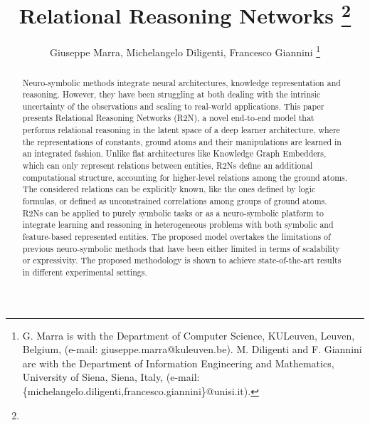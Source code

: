 \documentclass[journal]{IEEEtran}
\begin{document}
    \title{
    Relational Reasoning Networks
    \thanks{}}
  \author{Giuseppe Marra, Michelangelo Diligenti, Francesco Giannini \textbf{}
\thanks{G. Marra is with the Department of Computer Science, KULeuven, Leuven, Belgium, (e-mail: giuseppe.marra@kuleuven.be). M. Diligenti and F. Giannini are with the Department of Information Engineering and Mathematics, University of Siena, Siena, Italy, (e-mail: \{michelangelo.diligenti,francesco.giannini\}@unisi.it).}}




\maketitle



\begin{abstract}
Neuro-symbolic methods integrate neural architectures, knowledge representation and reasoning. However, they have been struggling at both dealing with the intrinsic uncertainty of the observations and scaling to real-world applications.
This paper presents Relational Reasoning Networks (R2N), a novel end-to-end model that performs relational reasoning in the latent space of a deep learner architecture, where the representations of constants, ground atoms and their manipulations are learned in an integrated fashion.
Unlike flat architectures like Knowledge Graph Embedders, which can only represent  relations between entities, R2Ns define an additional computational structure, accounting for higher-level relations among the ground atoms.
The considered relations can be explicitly known, like the ones defined by logic formulas, or defined as unconstrained correlations among groups of ground atoms. 
R2Ns can be applied to purely symbolic tasks or as a neuro-symbolic platform to integrate learning and reasoning in heterogeneous problems with both symbolic and feature-based represented entities. The proposed model overtakes the limitations of previous neuro-symbolic methods that have been either limited in terms of scalability or expressivity.
The proposed methodology is shown to achieve state-of-the-art results in different experimental settings.
\end{abstract}
\end{document}
